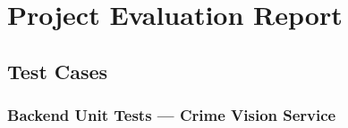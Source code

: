 \documentclass[12pt,a4paper]{report}
\begin{document}
\chapter{Project Evaluation Report}

\section{Test Cases}

\subsection{Backend Unit Tests — Crime Vision Service}
\end{document}
